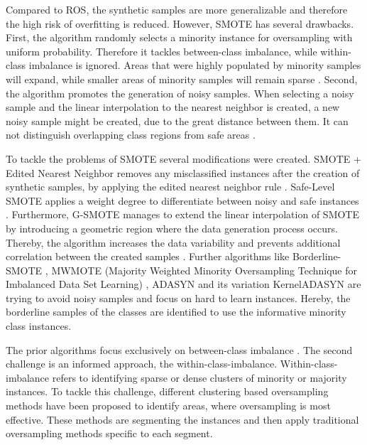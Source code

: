 \documentclass[parskip=full]{scrartcl}
\begin{document}
Compared to ROS, the synthetic samples are more generalizable and therefore the
high risk of overfitting is reduced. However, SMOTE has several drawbacks.
First, the algorithm randomly selects a minority instance for oversampling with
uniform probability. Therefore it tackles between-class imbalance, while
within-class imbalance is ignored. Areas that were highly populated by minority
samples will expand, while smaller areas of minority samples will remain sparse
\cite{Prati2004}. Second, the algorithm promotes the generation of noisy
samples. When selecting a noisy sample and the linear interpolation to the
nearest neighbor is created, a new noisy sample might be created, due to the
great distance between them. It can not distinguish overlapping class regions
from safe areas \cite{Bunkhumpornpat2009}. 

To tackle the problems of SMOTE several modifications were created. SMOTE +
Edited Nearest Neighbor removes any misclassified instances after the creation
of synthetic samples, by applying the edited nearest neighbor rule
\cite{Maria2004}. Safe-Level SMOTE applies a weight degree to differentiate
between noisy and safe instances \cite{Bunkhumpornpat2009}. Furthermore, G-SMOTE
manages to extend the linear interpolation of SMOTE by introducing a geometric
region where the data generation process occurs. Thereby, the algorithm
increases the data variability and prevents additional correlation between the
created samples \cite{Douzas2017}. Further algorithms like Borderline-SMOTE
\cite{Han2005}, MWMOTE (Majority Weighted Minority Oversampling Technique for
Imbalanced Data Set Learning) \cite{Barua2014}, ADASYN and its variation
KernelADASYN \cite{Tang2015} are trying to avoid noisy samples and focus on hard
to learn instances. Hereby, the borderline samples of the classes are identified
to use the informative minority class instances.

The prior algorithms focus exclusively on between-class imbalance
\cite{Nekooeimehr2015}. The second challenge is an informed approach, the
within-class-imbalance. Within-class-imbalance refers to identifying sparse or
dense clusters of minority or majority instances. To tackle this challenge,
different clustering based oversampling methods have been proposed to identify
areas, where oversampling is most effective. These methods are segmenting the
instances and then apply traditional oversampling methods specific to each
segment. 
\end{document}
